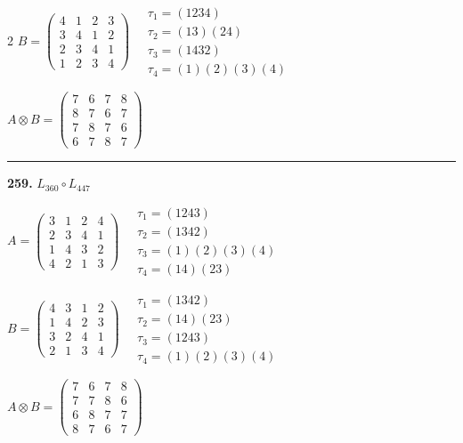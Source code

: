 \begin{multicols}{2}
$B = \begin{pmatrix} 4 & 1 & 2 & 3 \\ 3 & 4 & 1 & 2 \\ 2 & 3 & 4 & 1 \\ 1 & 2 & 3 & 4 \end{pmatrix} \quad \begin{matrix} \tau_{1}=(1 2 3 4) \\ \tau_{2}=(1 3)(2 4) \\ \tau_{3}=(1 4 3 2) \\ \tau_{4}=(1)(2)(3)(4) \end{matrix}$

$A \otimes B = \begin{pmatrix} 7 & 6 & 7 & 8 \\ 8 & 7 & 6 & 7 \\ 7 & 8 & 7 & 6 \\ 6 & 7 & 8 & 7 \end{pmatrix}$

\vspace{0.3em}
\hrule
\vspace{0.3em}

\noindent\textbf{259.} $L_{360} \circ L_{447}$

$A = \begin{pmatrix} 3 & 1 & 2 & 4 \\ 2 & 3 & 4 & 1 \\ 1 & 4 & 3 & 2 \\ 4 & 2 & 1 & 3 \end{pmatrix} \quad \begin{matrix} \tau_{1}=(1 2 4 3) \\ \tau_{2}=(1 3 4 2) \\ \tau_{3}=(1)(2)(3)(4) \\ \tau_{4}=(1 4)(2 3) \end{matrix}$

$B = \begin{pmatrix} 4 & 3 & 1 & 2 \\ 1 & 4 & 2 & 3 \\ 3 & 2 & 4 & 1 \\ 2 & 1 & 3 & 4 \end{pmatrix} \quad \begin{matrix} \tau_{1}=(1 3 4 2) \\ \tau_{2}=(1 4)(2 3) \\ \tau_{3}=(1 2 4 3) \\ \tau_{4}=(1)(2)(3)(4) \end{matrix}$

$A \otimes B = \begin{pmatrix} 7 & 6 & 7 & 8 \\ 7 & 7 & 8 & 6 \\ 6 & 8 & 7 & 7 \\ 8 & 7 & 6 & 7 \end{pmatrix}$


\end{multicols}
